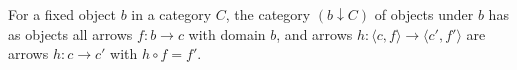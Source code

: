 For a fixed object $b$ in a category $C$, the category $(b \downarrow C)$ of objects under $b$ has as objects all arrows $f: b \to c$ with domain $b$, and arrows $h: \langle c, f \rangle \to \langle c', f' \rangle$ are arrows $h: c \to c'$ with $h \circ f = f'$.
